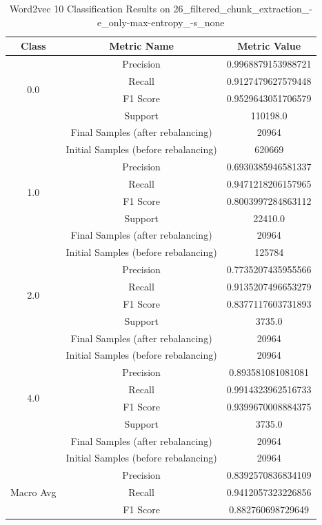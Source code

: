 \begin{longtable}{|c|c|c|}
\caption{Word2vec 10 Classification Results on 26\_filtered\_chunk\_extraction\_-e\_only-max-entropy\_-s\_none} \label{tab:26_filtered_chunk_extraction_-e_only-max-entropy_-s_none_word2vec_10_classifiers_results} \\
\hline
Class & Metric Name & Metric Value \\
\hline
\multirow{4}{*}{0.0} & Precision & 0.9968879153988721 \\
 & Recall & 0.9127479627579448 \\
 & F1 Score & 0.9529643051706579 \\
 & Support & 110198.0 \\
 & Final Samples (after rebalancing) & 20964 \\
 & Initial Samples (before rebalancing) & 620669 \\
\hline
\multirow{4}{*}{1.0} & Precision & 0.6930385946581337 \\
 & Recall & 0.9471218206157965 \\
 & F1 Score & 0.8003997284863112 \\
 & Support & 22410.0 \\
 & Final Samples (after rebalancing) & 20964 \\
 & Initial Samples (before rebalancing) & 125784 \\
\hline
\multirow{4}{*}{2.0} & Precision & 0.7735207435955566 \\
 & Recall & 0.9135207496653279 \\
 & F1 Score & 0.8377117603731893 \\
 & Support & 3735.0 \\
 & Final Samples (after rebalancing) & 20964 \\
 & Initial Samples (before rebalancing) & 20964 \\
\hline
\multirow{4}{*}{4.0} & Precision & 0.893581081081081 \\
 & Recall & 0.9914323962516733 \\
 & F1 Score & 0.9399670008884375 \\
 & Support & 3735.0 \\
 & Final Samples (after rebalancing) & 20964 \\
 & Initial Samples (before rebalancing) & 20964 \\
\hline
\multirow{4}{*}{Macro Avg} & Precision & 0.8392570836834109 \\
 & Recall & 0.9412057323226856 \\
 & F1 Score & 0.882760698729649 \\

\end{longtable}
